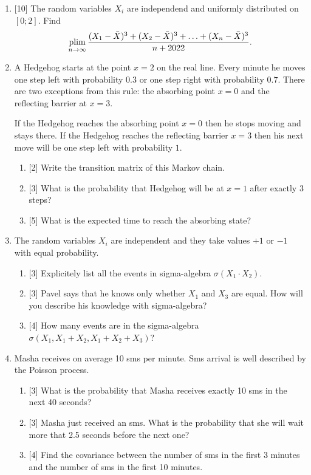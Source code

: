 \begin{enumerate}

  \item {[10]} The random variables $X_i$ are independend and uniformly distributed on $[0;2]$.
  Find 
      \[
      \operatorname*{plim}_{n\to\infty}  \frac{(X_1 - \bar X)^3 + (X_2 - \bar X)^3 + \ldots + (X_n - \bar X)^3}{n + 2022}.
      \]
      
  
  \item A Hedgehog starts at the point $x=2$ on the real line. 
  Every minute he moves one step left with probability $0.3$ or one step right with probability $0.7$.
  There are two exceptions from this rule: the absorbing point $x=0$ and the reflecting barrier at $x=3$.
  
  If the Hedgehog reaches the absorbing point $x=0$ then he stops moving and stays there. 
  If the Hedgehog reaches the reflecting barrier $x=3$ then his next move will be one step left with probability $1$.
  
  \begin{enumerate}
  \item {[2]} Write the transition matrix of this Markov chain. 
  \item {[3]} What is the probability that Hedgehog will be at $x=1$ after exactly 3 steps?
  \item {[5]} What is the expected time to reach the absorbing state?
  \end{enumerate}
  
  
  \item The random variables $X_i$ are independent and they take values $+1$ or $-1$ with equal probability. 
  
  \begin{enumerate}
  \item {[3]} Explicitely list all the events in sigma-algebra $\sigma(X_1 \cdot X_2)$.
  \item {[3]} Pavel says that he knows only whether $X_1$ and $X_3$ are equal. 
  How will you describe his knowledge with sigma-algebra?
  \item {[4]} How many events are in the sigma-algebra $\sigma(X_1, X_1 + X_2, X_1 + X_2 + X_3)$?
  \end{enumerate}
  
  
  \item Masha receives on average 10 sms per minute. Sms arrival is well described by the Poisson process. 
  
  \begin{enumerate}
  \item {[3]} What is the probability that Masha receives exactly 10 sms in the next 40 seconds?
  \item {[3]} Masha just received an sms. What is the probability that she will wait more that 2.5 seconds before the next one?
  \item {[4]} Find the covariance between the number of sms in the first 3 minutes and the number of sms in the first 10 minutes. 
  \end{enumerate}
  

\end{enumerate}
